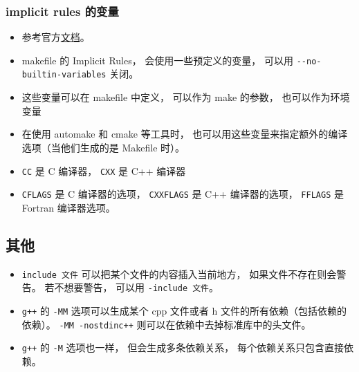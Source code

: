 \subsubsection{implicit rules 的变量}
\begin{itemize}
\item 参考官方\href{https://www.gnu.org/software/make/manual/html_node/Implicit-Variables.html}{文档}。
\item makefile 的 Implicit Rules， 会使用一些预定义的变量， 可以用 \verb|--no-builtin-variables| 关闭。
\item 这些变量可以在 makefile 中定义， 可以作为 make 的参数， 也可以作为环境变量
\item 在使用 automake 和 cmake 等工具时， 也可以用这些变量来指定额外的编译选项（当他们生成的是 Makefile 时）。
\item \verb|CC| 是 C 编译器， \verb|CXX| 是 C++ 编译器
\item \verb|CFLAGS| 是 C 编译器的选项， \verb|CXXFLAGS| 是 C++ 编译器的选项， \verb|FFLAGS| 是 Fortran 编译器选项。
\end{itemize}

\subsection{其他}
\begin{itemize}
\item \verb|include 文件| 可以把某个文件的内容插入当前地方， 如果文件不存在则会警告。 若不想要警告， 可以用 \verb|-include 文件|。
\item \verb|g++| 的 \verb|-MM| 选项可以生成某个 cpp 文件或者 h 文件的所有依赖（包括依赖的依赖）。 \verb|-MM -nostdinc++| 则可以在依赖中去掉标准库中的头文件。
\item \verb|g++| 的 \verb|-M| 选项也一样， 但会生成多条依赖关系， 每个依赖关系只包含直接依赖。
\end{itemize}
